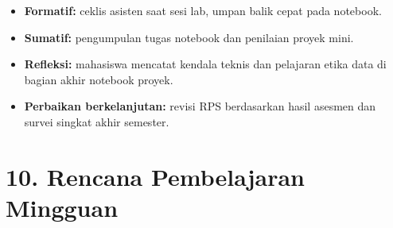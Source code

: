 \documentclass[12pt,a4paper]{article}
\begin{document}
\begin{itemize}[leftmargin=*]
  \item \textbf{Formatif:} ceklis asisten saat sesi lab, umpan balik cepat pada notebook.
  \item \textbf{Sumatif:} pengumpulan tugas notebook dan penilaian proyek mini.
  \item \textbf{Refleksi:} mahasiswa mencatat kendala teknis dan pelajaran etika data di bagian akhir notebook proyek.
  \item \textbf{Perbaikan berkelanjutan:} revisi RPS berdasarkan hasil asesmen dan survei singkat akhir semester.
\end{itemize}

\vspace{0.5cm}

\section*{10. Rencana Pembelajaran Mingguan}
\end{document}
